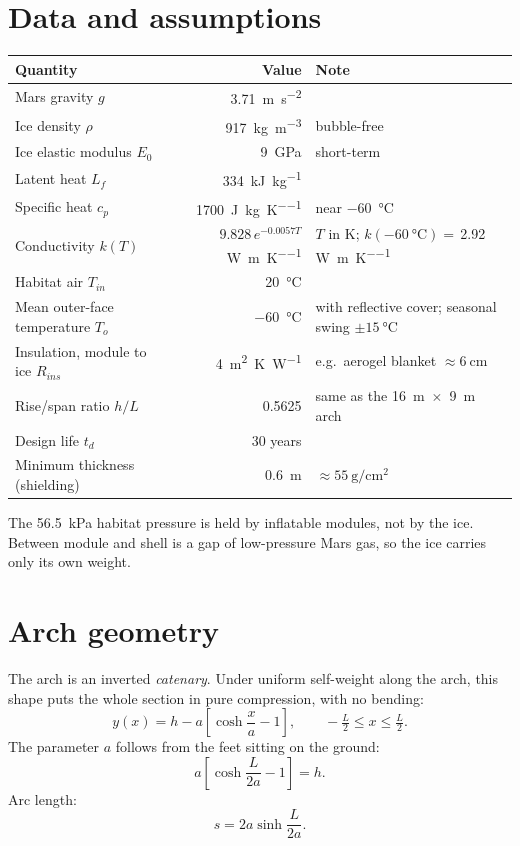 \documentclass[11pt,a4paper]{article}
\begin{document}
\section{Data and assumptions}
\begin{table}[h]\centering\small
\begin{tabularx}{\linewidth}{lrX}\toprule
Quantity & Value & Note \\\midrule
Mars gravity $g$ & \SI{3.71}{\metre\per\second\squared} & \\
Ice density $\rho$ & \SI{917}{\kilo\gram\per\metre\cubed} & bubble-free \\
Ice elastic modulus $E_0$ & \SI{9}{\giga\pascal} & short-term \\
Latent heat $L_f$ & \SI{334}{\kilo\joule\per\kilo\gram} & \\
Specific heat $c_p$ & \SI{1700}{\joule\per\kilo\gram\per\kelvin} & near \SI{-60}{\celsius} \\
Conductivity $k(T)$ & $9.828\,e^{-0.0057T}$ \si{\watt\per\metre\per\kelvin} & $T$ in K; $k(\SI{-60}{\celsius})=\,$\num{2.92} \si{\watt\per\metre\per\kelvin} \\
Habitat air $T_{in}$ & \SI{20}{\celsius} & \\
Mean outer-face temperature $T_o$ & \SI{-60}{\celsius} & with reflective cover; seasonal swing $\pm\SI{15}{\celsius}$ \\
Insulation, module to ice $R_{ins}$ & \SI{4}{\metre\squared\kelvin\per\watt} & e.g.\ aerogel blanket $\approx\SI{6}{\centi\metre}$ \\
Rise/span ratio $h/L$ & \num{0.5625} & same as the \SI{16}{\metre}~$\times$~\SI{9}{\metre} arch \\
Design life $t_d$ & 30 years & \\
Minimum thickness (shielding) & \SI{0.6}{\metre} & $\approx\SI{55}{\gram\per\centi\metre\squared}$ \\
\bottomrule\end{tabularx}
\end{table}
The \SI{56.5}{\kilo\pascal} habitat pressure is held by inflatable modules, not by the ice. Between module and shell is a gap of low-pressure Mars gas, so the ice carries only its own weight.

\section{Arch geometry}
The arch is an inverted \emph{catenary}. Under uniform self-weight along the arch, this shape puts the whole section in pure compression, with no bending:
\begin{equation}
y(x) = h - a\left[\cosh\frac{x}{a}-1\right], \qquad -\tfrac{L}{2}\le x\le \tfrac{L}{2}.
\end{equation}
The parameter $a$ follows from the feet sitting on the ground:
\begin{equation}
a\left[\cosh\frac{L}{2a}-1\right]=h .
\end{equation}
Arc length:
\begin{equation}
s = 2a\sinh\frac{L}{2a}.
\end{equation}
\end{document}
